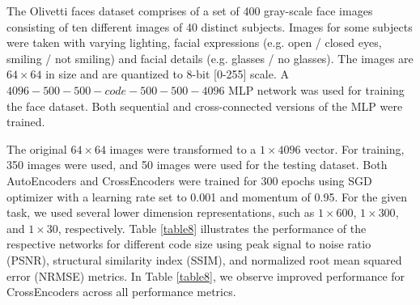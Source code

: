 \documentclass{jcmlatex}
\begin{document}
The Olivetti faces dataset \cite{minear2004lifespan} comprises of a set of 400 gray-scale face images consisting of ten different images of 40 distinct subjects. Images for some subjects were taken with varying lighting, facial expressions (e.g. open / closed eyes, smiling / not smiling) and facial details (e.g. glasses / no glasses). %
The images are $64\times64$ in size and are quantized to 8-bit [0-255] scale. A $4096-500-500-code-500-500-4096$ MLP network was used for training the face dataset. Both sequential and cross-connected versions of the MLP were trained.

The original $64\times64$ images were transformed to a $1\times4096$ vector. For training, 350 images were used, and 50 images were used for the testing dataset. Both AutoEncoders and CrossEncoders were trained for 300 epochs using SGD optimizer with a learning rate set to 0.001 and momentum of 0.95. For the given task, we used several lower dimension representations, such as $1\times600$, $1\times300$, and $1\times30$, respectively. Table \ref{table8} illustrates the performance of the respective networks for different code size using peak signal to noise ratio (PSNR), structural similarity index (SSIM), and normalized root mean squared error (NRMSE) metrics. In Table \ref{table8}, we observe improved performance for CrossEncoders across all performance metrics.
\end{document}
